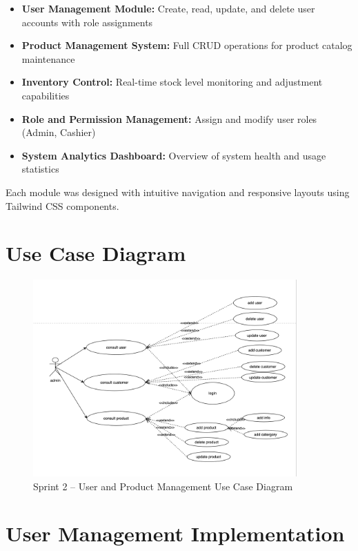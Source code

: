 \begin{itemize}
  \item \textbf{User Management Module:} Create, read, update, and delete user accounts with role assignments
  \item \textbf{Product Management System:} Full CRUD operations for product catalog maintenance
  \item \textbf{Inventory Control:} Real-time stock level monitoring and adjustment capabilities
  \item \textbf{Role and Permission Management:} Assign and modify user roles (Admin, Cashier)
  \item \textbf{System Analytics Dashboard:} Overview of system health and usage statistics
\end{itemize}

Each module was designed with intuitive navigation and responsive layouts using Tailwind CSS components.

\section{Use Case Diagram}

\begin{figure}[H]
  \centering
  \includegraphics[width=0.9\textwidth]{figures/images/sprint2usecase.png}
  \caption{Sprint 2 – User and Product Management Use Case Diagram}
  \label{fig:sprint2-usecase}
\end{figure}

\section{User Management Implementation}

